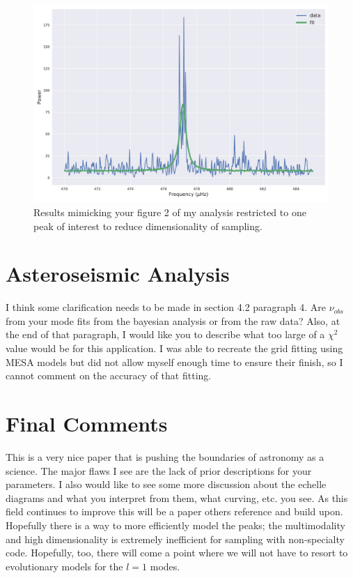 \documentclass[10pt,a4paper]{article}
\begin{document}
		\begin{figure}
			\centering
			\includegraphics[width=\linewidth]{figs/mode_fit}
			\caption{Results mimicking your figure 2 of my analysis restricted to one peak of interest to reduce dimensionality of sampling.}
		\end{figure}
		
		\section{Asteroseismic Analysis}
		
		I think some clarification needs to be made in section 4.2 paragraph 4. Are $\nu_{obs}$ from your mode fits from the bayesian analysis or from the raw data? Also, at the end of that paragraph, I would like you to describe what too large of a $\chi^2$ value would be for this application. I was able to recreate the grid fitting using MESA models but did not allow myself enough time to ensure their finish, so I cannot comment on the accuracy of that fitting. 
		
		\section{Final Comments}
		
		This is a very nice paper that is pushing the boundaries of astronomy as a science. The major flaws I see are the lack of prior descriptions for your parameters. I also would like to see some more discussion about the echelle diagrams and what you interpret from them, what curving, etc. you see. As this field continues to improve this will be a paper others reference and build upon. Hopefully there is a way to more efficiently model the peaks; the multimodality and high dimensionality is extremely inefficient for sampling with non-specialty code. Hopefully, too, there will come a point where we will not have to resort to evolutionary models for the $l=1$ modes.
		
\end{document}
